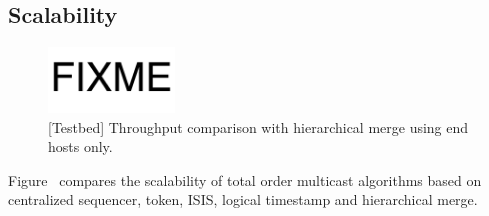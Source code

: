 \subsection{Scalability}

\begin{figure}[t]
\centering
\includegraphics[width=0.3\textwidth]{images/fixme.pdf}
\caption{[Testbed] Throughput comparison with hierarchical merge using end hosts only.}
\label{fig:total-order}
\end{figure}

Figure~\label{fig:total-order} compares the scalability of \sys total order multicast algorithms based on centralized sequencer, token, ISIS, logical timestamp and hierarchical merge.

